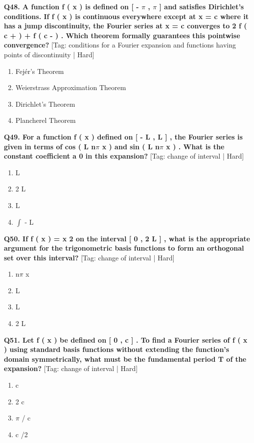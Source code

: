 \noindent\textbf{Q48. A function f ( x ) is defined on [ - $\pi$ , $\pi$ ] and satisfies Dirichlet's conditions. If f ( x ) is continuous everywhere except at x = c where it has a jump discontinuity, the Fourier series at x = c converges to 2 f ( c + ) + f ( c - ) . Which theorem formally guarantees this pointwise convergence?} \hfill [Tag: conditions for a Fourier expansion and functions having points of discontinuity | Hard]
\begin{enumerate}[label=(\alph*),topsep=2pt,itemsep=1pt,partopsep=0pt,parsep=0pt]
    \item {{Fejér's Theorem}}
    \item {{Weierstrass Approximation Theorem}}
    \item {{Dirichlet's Theorem}}
    \item {{Plancherel Theorem}}
\end{enumerate}
\vspace{2mm}

\noindent\textbf{Q49. For a function f ( x ) defined on [ - L , L ] , the Fourier series is given in terms of cos ( L n$\pi$ x ) and sin ( L n$\pi$ x ) . What is the constant coefficient a 0 in this expansion?} \hfill [Tag: change of interval | Hard]
\begin{enumerate}[label=(\alph*),topsep=2pt,itemsep=1pt,partopsep=0pt,parsep=0pt]
    \item {{L}}
    \item {{2 L}}
    \item {{L}}
    \item {{$\int$ - L}}
\end{enumerate}
\vspace{2mm}

\noindent\textbf{Q50. If f ( x ) = x 2 on the interval [ 0 , 2 L ] , what is the appropriate argument for the trigonometric basis functions to form an orthogonal set over this interval?} \hfill [Tag: change of interval | Hard]
\begin{enumerate}[label=(\alph*),topsep=2pt,itemsep=1pt,partopsep=0pt,parsep=0pt]
    \item {{n$\pi$ x}}
    \item {{L}}
    \item {{L}}
    \item {{2 L}}
\end{enumerate}
\vspace{2mm}

\noindent\textbf{Q51. Let f ( x ) be defined on [ 0 , c ] . To find a Fourier series of f ( x ) using standard basis functions without extending the function's domain symmetrically, what must be the fundamental period T of the expansion?} \hfill [Tag: change of interval | Hard]
\begin{enumerate}[label=(\alph*),topsep=2pt,itemsep=1pt,partopsep=0pt,parsep=0pt]
    \item {{c}}
    \item {{2 c}}
    \item {{$\pi$ / c}}
    \item {{c /2}}
\end{enumerate}
\vspace{2mm}

